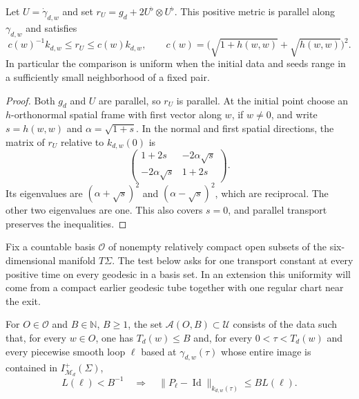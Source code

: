 \begin{lemma}
\label{test:observer-comparison}
Let $U=\dot\gamma_{d,w}$ and set
$r_U=g_d+2U^\flat\otimes U^\flat$. This positive metric is parallel
along $\gamma_{d,w}$ and satisfies
\begin{equation}\label{test:observer-norm-bound}
 c(w)^{-1}k_{d,w}\le r_U\le c(w)k_{d,w},
 \qquad
 c(w)=\bigl(\sqrt{1+h(w,w)}+\sqrt{h(w,w)}\bigr)^2.
\end{equation}
In particular the comparison is uniform when the initial data and
seeds range in a sufficiently small neighborhood of a fixed pair.
\end{lemma}

\begin{proof}
Both $g_d$ and $U$ are parallel, so $r_U$ is parallel. At the initial
point choose an $h$-orthonormal spatial frame with first vector along
$w$, if $w\ne0$, and write $s=h(w,w)$ and
$\alpha=\sqrt{1+s}$. In the normal and first spatial directions,
the matrix of $r_U$ relative to $k_{d,w}(0)$ is
\[
 \begin{pmatrix}1+2s&-2\alpha\sqrt{s}\\
                 -2\alpha\sqrt{s}&1+2s\end{pmatrix}.
\]
Its eigenvalues are $(\alpha+\sqrt{s})^2$ and
$(\alpha-\sqrt{s})^2$, which are reciprocal. The other two
eigenvalues are one. This also covers $s=0$, and parallel transport
preserves the inequalities.
\end{proof}

Fix a countable basis $\mathcal O$ of nonempty relatively compact
open subsets of the six-dimensional manifold $T\Sigma$.
The test below asks for one transport constant at every positive time
on every geodesic in a basis set. In an extension this uniformity will
come from a compact earlier geodesic tube together with one regular
chart near the exit.

\begin{definition}\label{test:definition}
For $O\in\mathcal O$ and $B\in\mathbb N$, $B\ge1$, the set
$\mathcal A(O,B)\subset\mathcal U$ consists of the data such that,
for every $w\in O$, one has $T_d(w)\le B$ and, for every
$0<\tau<T_d(w)$ and every piecewise smooth loop $\ell$ based at
$\gamma_{d,w}(\tau)$ whose entire image is contained in
$I^+_{\mathcal M_d}(\Sigma)$,
\begin{equation}\label{test:inequality}
 L(\ell)<B^{-1}
 \quad\Longrightarrow\quad
 \lVert P_\ell-\operatorname{Id}\rVert_{k_{d,w}(\tau)}
       \le B L(\ell).
\end{equation}
\end{definition}

